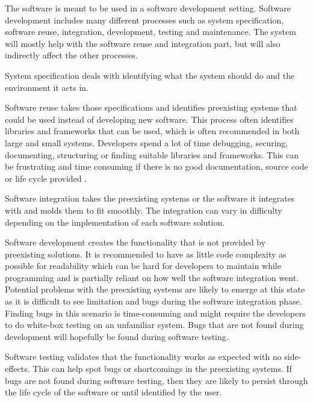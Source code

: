 The software is meant to be used in a software development setting. Software development \cite{wiki:softwareDevelopment} includes many different processes such as system specification, software reuse, integration, development, testing and maintenance. The system will mostly help with the software reuse and integration part, but will also indirectly affect the other processes.

System specification deals with identifying what the system should do and the environment it acts in.

Software reuse takes those specifications and identifies preexisting systems that could be used instead of developing new software. This process often identifies libraries and frameworks that can be used, which is often recommended \cite{Krueger:1992:SR:130844.130856} in both large and small systems. Developers spend a lot of time debugging, securing, documenting, structuring or finding suitable libraries and frameworks. This can be frustrating and time consuming if there is no good documentation, source code or life cycle provided \cite{mileva2009mining}.

Software integration takes the preexisting systems or the software it integrates with and molds them to fit smoothly. The integration can vary in difficulty depending on the implementation of each software solution. 

Software development creates the functionality that is not provided by preexisting solutions. It is recommended to have as little code complexity \cite{DBLP:journals/corr/abs-1712-00675} as possible for readability  \cite{spinellis2003readingWritingCode} which can be hard for developers to maintain while programming and is partially reliant on how well the software integration went. Potential problems with the preexisting systems are likely to emerge at this state as it is difficult to see limitation and bugs during the software integration phase. Finding bugs in this scenario is time-consuming \cite{westland2002cost} and might require the developers to do white-box testing on an unfamiliar system.
Bugs that are not found during development will hopefully be found during software testing.

Software testing validates that the functionality works as expected with no side-effects. This can help spot bugs or shortcomings in the preexisting systems. If bugs are not found during software testing, then they are likely to persist through the life cycle of the software or until identified by the user.

